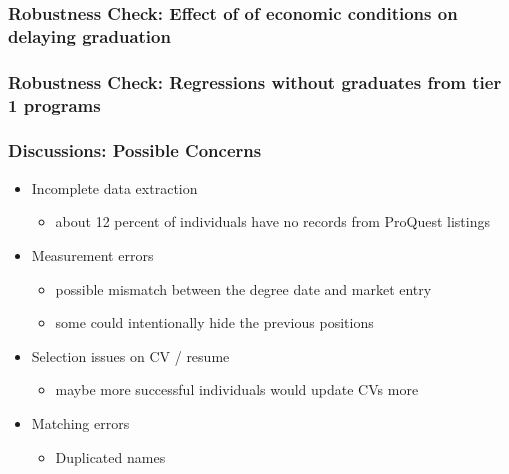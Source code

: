 \documentclass[11pt]{beamer}
\begin{document}
{
	\begin{frame}[label = delay]
		\frametitle{Robustness Check: Effect of of economic conditions on delaying graduation}
		 
	\end{frame}
}

{
	\begin{frame}[label = rank2]
		\frametitle{Robustness Check: Regressions without graduates from tier 1 programs}
		 
	\end{frame}
}

\begin{frame}
\frametitle{Discussions: Possible Concerns}
	\begin{itemize}
		\item Incomplete data extraction
		\begin{itemize}
			\item about 12 percent of individuals have no records from ProQuest listings 
		\end{itemize}
		\vspace{1 mm}
		\item Measurement errors
		\begin{itemize}
			\item possible mismatch between the degree date and market entry
			\item  some could intentionally hide the previous positions
		\end{itemize}

		\vspace{1 mm}
		\item Selection issues on CV / resume
		\begin{itemize}
			\item maybe more successful individuals would update CVs more    
		\end{itemize}
		\item Matching errors
		\vspace{1 mm}
		\begin{itemize}
			\item Duplicated names
		\end{itemize}
	\end{itemize}
\end{frame}
\end{document}
